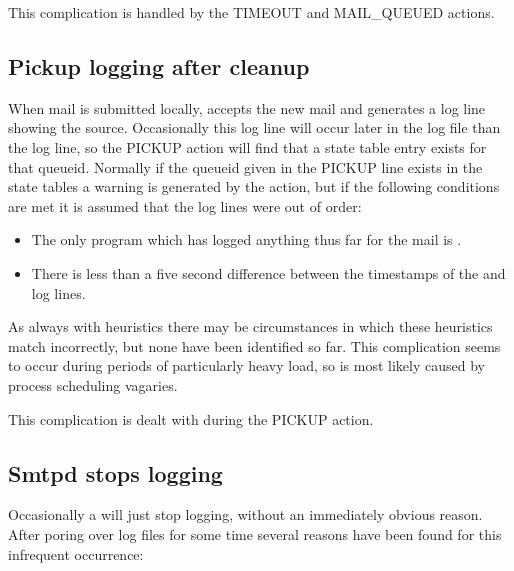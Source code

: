 This complication is handled by the TIMEOUT and MAIL\_QUEUED actions.

\subsection{Pickup logging after cleanup}

\label{pickup logging after cleanup}

When mail is submitted locally,  accepts the new mail and
generates a log line showing the source.  Occasionally this log line will
occur later in the log file than the  log line, so the
PICKUP action will find that a state table entry exists for that queueid.
Normally if the queueid given in the PICKUP line exists in the state tables
a warning is generated by the  action, but if the following
conditions are met it is assumed that the log lines were out of order:

\begin{itemize}

    \item The only program which has logged anything thus far for the mail
        is .

    \item There is less than a five second difference between the
        timestamps of the  and  log lines.

\end{itemize}

As always with heuristics there may be circumstances in which these
heuristics match incorrectly, but none have been identified so far.  This
complication seems to occur during periods of particularly heavy load, so
is most likely caused by process scheduling vagaries.  

This complication is dealt with during the PICKUP action.

\subsection{Smtpd stops logging}

\label{smtpd stops logging}

Occasionally a  will just stop logging, without an
immediately obvious reason.  After poring over log files for some time
several reasons have been found for this infrequent occurrence:

